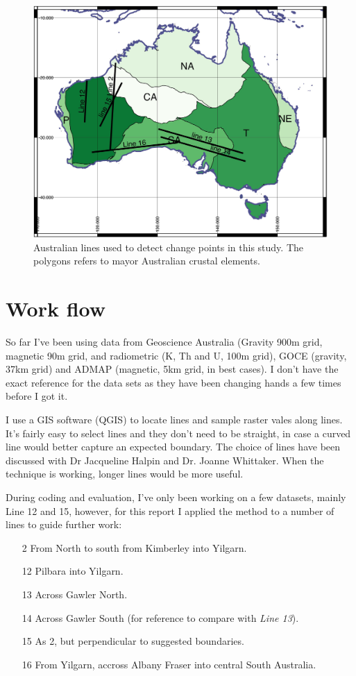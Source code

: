 \begin{figure}[h]
	\centering
	\includegraphics[width=1\linewidth]{../fig/maps/aus_lines}
	\caption[Australian lines]{Australian lines used to detect change points in this study. The polygons refers to  mayor Australian crustal elements.}
	\label{fig:aus_lines}
\end{figure}

\section{Work flow}
So far I've been using data from Geoscience Australia (Gravity 900m grid, magnetic 90m grid, and radiometric (K, Th and U, 100m grid), GOCE (gravity, 37km grid) and ADMAP (magnetic, 5km grid, in best cases). I don't have the exact reference for the data sets as they have been changing hands a few times before I got it. 

I use a GIS software (QGIS) to locate lines and sample raster vales along lines. It's fairly easy to select lines and they don't need to be straight, in case a curved line would better capture an expected boundary. The choice of lines have been discussed with Dr Jacqueline Halpin and Dr. Joanne Whittaker. When the technique is working, longer lines would be more useful.

During coding and evaluation, I've only been working on a few datasets, mainly Line 12 and 15, however, for this report I applied the method to a number of lines to guide further work: 

\begin{itemize}
	\item [2] From North to south from Kimberley into Yilgarn. 
	\item [12] Pilbara into Yilgarn.
	\item [13] Across Gawler North.
	\item [14] Across Gawler South (for reference to compare with \textit{Line 13}).
	\item [15] As 2, but perpendicular to suggested boundaries.
	\item[16] From Yilgarn, accross Albany Fraser into central South Australia. 
\end{itemize}

